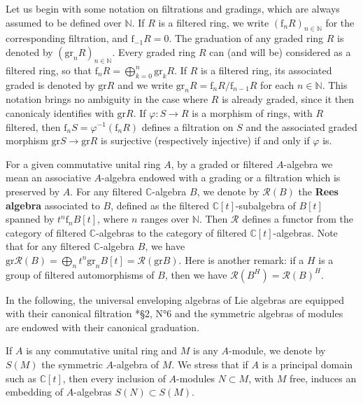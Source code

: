 \documentclass{amsart}
\theoremstyle{definition}
\begin{document}
Let us begin with some notation on filtrations and gradings, which are always assumed to be defined over $\mathbb{N}$.
If $R$ is a filtered ring, we write $(\mathrm{f}_nR)_{n\in\mathbb{N}}$ for the corresponding filtration, and $\mathrm{f}_{-1}R = 0$. The graduation of any graded ring $R$ is denoted by $(\mathrm{gr}_nR)_{n\in\mathbb{N}}$. Every graded ring $R$ can (and will be) considered as a filtered ring, so that $\mathrm{f}_n R = \bigoplus_{k = 0}^n \mathrm{gr}_kR$. If $R$ is a filtered ring, its associated graded is denoted by $\mathrm{gr}R$ and we write $\mathrm{gr}_nR = \mathrm{f}_nR/\mathrm{f}_{n-1}R$ for each $n \in \mathbb{N}$. This notation brings no ambiguity in the case where $R$ is already graded, since it then canonicaly identifies with $\mathrm{gr}R$. If $\varphi : S \to R$ is a morphism of rings, with $R$ filtered, then $\mathrm{f}_nS = \varphi^{-1}(\mathrm{f}_nR)$ defines a filtration on $S$ and the associated graded morphism $\mathrm{gr}S \to \mathrm{gr}R$ is surjective (respectively injective) if and only if $\varphi$ is.

For a given commutative unital ring $A$, by a graded or filtered $A$-algebra we mean an associative $A$-algebra endowed with a grading or a filtration which is preserved by $A$. For any filtered $\mathbb{C}$-algebra $B$, we denote by $\mathcal{R}(B)$ the \textbf{Rees algebra} associated to $B$, defined as the filtered $\mathbb{C}[t]$-subalgebra of $B[t]$ spanned by $t^n\mathrm{f}_n B[t]$, where $n$ ranges over $\mathbb{N}$. Then $\mathcal{R}$ defines a functor from the category of filtered $\mathbb{C}$-algebras to the category of filtered $\mathbb{C}[t]$-algebras. Note that for any filtered $\mathbb{C}$-algebra $B$, we have \(\mathrm{gr}\mathcal{R}(B) = \textstyle\bigoplus_n t^n \mathrm{gr}_nB[t] = \mathcal{R}(\mathrm{gr}B).\) Here is another remark: if a $H$ is a group of filtered automorphisms of $B$, then we have $\mathcal{R}(B^H) = \mathcal{R}(B)^H$.

In the following, the universal enveloping algebras of Lie algebras are equipped with their canonical filtration \cite{GrAlLie1}*{§2, N°6} and the symmetric algebras of modules are endowed with their canonical graduation.

If $A$ is any commutative unital ring and $M$ is any $A$-module, we denote by $S(M)$ the symmetric $A$-algebra of $M$. We stress that if $A$ is a principal domain such as $\mathbb{C}[t]$, then every inclusion of $A$-modules $N \subset M$, with $M$ free, induces an embedding of $A$-algebras $S(N) \subset S(M)$.
\end{document}
